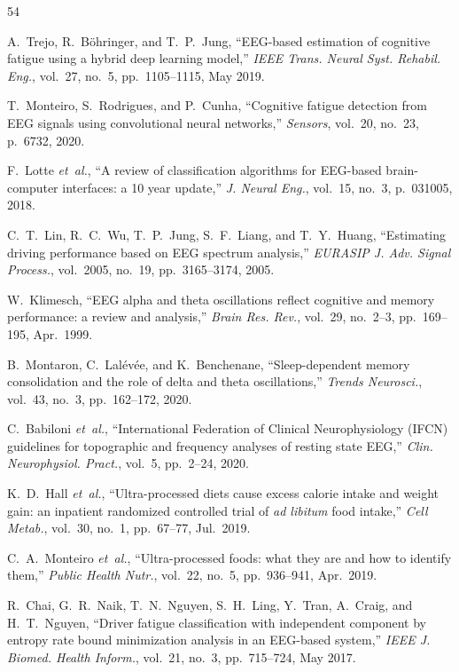 \documentclass[journal,twoside,10pt]{IEEEtran}
\begin{document}

\begin{thebibliography}{54}

 A.~Trejo, R.~B\"{o}hringer, and T.~P.~Jung, ``EEG-based estimation of cognitive fatigue using a hybrid deep learning model,'' \textit{IEEE Trans. Neural Syst. Rehabil. Eng.}, vol.~27, no.~5, pp.~1105--1115, May 2019.

 T.~Monteiro, S.~Rodrigues, and P.~Cunha, ``Cognitive fatigue detection from EEG signals using convolutional neural networks,'' \textit{Sensors}, vol.~20, no.~23, p.~6732, 2020.

 F.~Lotte \textit{et~al.}, ``A review of classification algorithms for EEG-based brain-computer interfaces: a 10 year update,'' \textit{J. Neural Eng.}, vol.~15, no.~3, p.~031005, 2018.

 C.~T.~Lin, R.~C.~Wu, T.~P.~Jung, S.~F.~Liang, and T.~Y.~Huang, ``Estimating driving performance based on EEG spectrum analysis,'' \textit{EURASIP J. Adv. Signal Process.}, vol.~2005, no.~19, pp.~3165--3174, 2005.

 W.~Klimesch, ``EEG alpha and theta oscillations reflect cognitive and memory performance: a review and analysis,'' \textit{Brain Res. Rev.}, vol.~29, no.~2--3, pp.~169--195, Apr.~1999.

 B.~Montaron, C.~Lal\'{e}v\'{e}e, and K.~Benchenane, ``Sleep-dependent memory consolidation and the role of delta and theta oscillations,'' \textit{Trends Neurosci.}, vol.~43, no.~3, pp.~162--172, 2020.

 C.~Babiloni \textit{et~al.}, ``International Federation of Clinical Neurophysiology (IFCN) guidelines for topographic and frequency analyses of resting state EEG,'' \textit{Clin. Neurophysiol. Pract.}, vol.~5, pp.~2--24, 2020.

 K.~D.~Hall \textit{et~al.}, ``Ultra-processed diets cause excess calorie intake and weight gain: an inpatient randomized controlled trial of \textit{ad libitum} food intake,'' \textit{Cell Metab.}, vol.~30, no.~1, pp.~67--77, Jul.~2019.

 C.~A.~Monteiro \textit{et~al.}, ``Ultra-processed foods: what they are and how to identify them,'' \textit{Public Health Nutr.}, vol.~22, no.~5, pp.~936--941, Apr.~2019.

 R.~Chai, G.~R.~Naik, T.~N.~Nguyen, S.~H.~Ling, Y.~Tran, A.~Craig, and H.~T.~Nguyen, ``Driver fatigue classification with independent component by entropy rate bound minimization analysis in an EEG-based system,'' \textit{IEEE J. Biomed. Health Inform.}, vol.~21, no.~3, pp.~715--724, May 2017.


\end{thebibliography}
\end{document}
